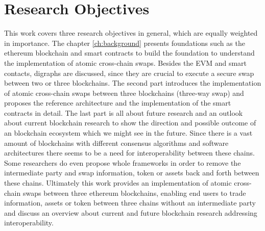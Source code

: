 %
%
\section{Research Objectives}
\label{sec:intro:goal}
This work covers three research objectives in general, which are equally weighted in importance. The chapter \ref{ch:background} presents foundations such as the ethereum blockchain and smart contracts to build the foundation to understand the implementation of atomic cross-chain swaps. Besides the \ac{EVM} and smart contacts, digraphs are discussed, since they are crucial to execute a secure swap between two or three blockchains. The second part introduces the implementation of atomic cross-chain swaps between three blockchains (three-way swap) and proposes the reference architecture and the implementation of the smart contracts in detail. The last part is all about future research and an outlook about current blockchain research to show the direction and possible outcome of an blockchain ecosystem which we might see in the future. Since there is a vast amount of blockchains with different consensus algorithms and software architectures there seems to be a need for interoperability between these chains. Some researchers do even propose whole frameworks in order to remove the intermediate party and swap information, token or assets back and forth between these chains. Ultimately this work provides an implementation of atomic cross-chain swaps between three ethereum blockchains, enabling end users to trade information, assets or token between three chains without an intermediate party and discuss an overview about current and future blockchain research addressing interoperability.


%
%
